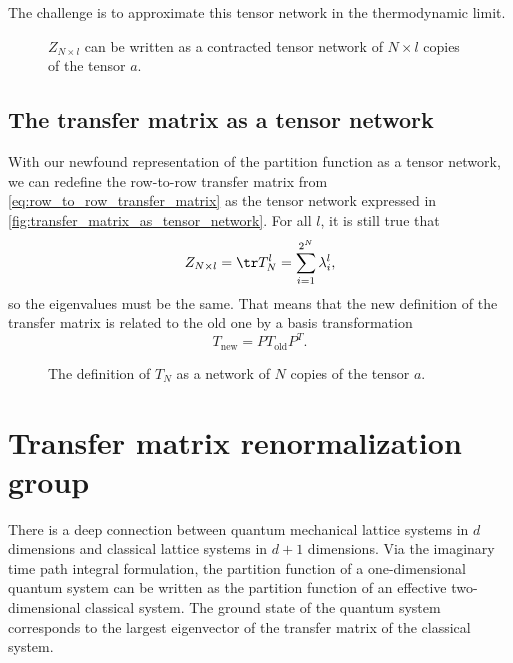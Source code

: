 The challenge is to approximate this tensor network in the thermodynamic limit.

\begin{figure}
  
  \caption{$Z_{N \times l}$ can be written as a contracted tensor network of $N \times l$
  copies of the tensor $a$.}
  \label{fig:2d_ising_as_tensor_network}
\end{figure}

\subsection{The transfer matrix as a tensor network}

With our newfound representation of the partition function as a tensor network, we can
redefine the row-to-row transfer matrix from
\autoref{eq:row_to_row_transfer_matrix} as the tensor network expressed in
\autoref{fig:transfer_matrix_as_tensor_network}. For all $l$, it is still true that
\begin{equation}
  Z_{N \times l} = \tr T_{N}^{l} = \sum_{i = 1}^{2^N} \lambda_{i}^{l},
\end{equation}
so the eigenvalues must be the same. That means that the new definition of the transfer
matrix is related to the old one by a basis transformation
\begin{equation}
  T_{\text{new}} = P T_{\text{old}} P^{T}.
\end{equation}

\begin{figure}
  
  \caption{The definition of $T_N$ as a network of $N$ copies of the tensor $a$.}
  \label{fig:transfer_matrix_as_tensor_network}
\end{figure}

\section{Transfer matrix renormalization group}\label{sec:tmrg}
There is a deep connection between quantum mechanical lattice systems in $d$ dimensions
and classical lattice systems in $d + 1$ dimensions. Via the imaginary time path integral
formulation, the partition function of a one-dimensional quantum system can be written as
the partition function of an effective two-dimensional classical system. The ground state
of the quantum system corresponds to the largest eigenvector of the transfer matrix of the
classical system.

